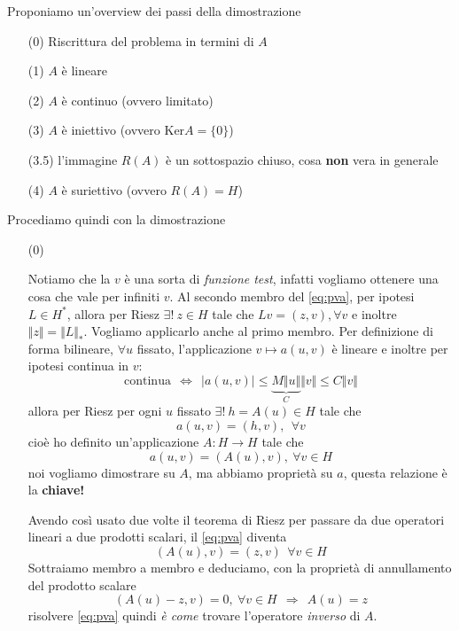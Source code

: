 \begin{dimostrazione}
    Proponiamo un'overview dei passi della dimostrazione
    \begin{enumerate}
        \item[(0)] Riscrittura del problema in termini di $A$
        \item[(1)] $A$ è lineare
        \item[(2)] $A$ è continuo (ovvero limitato)
        \item[(3)] $A$ è iniettivo (ovvero $\mathrm{Ker} A=\{0\}$)
        \item[(3.5)] l'immagine $R(A)$ è un sottospazio chiuso, cosa \textbf{non} vera in generale
        \item[(4)] $A$ è suriettivo (ovvero $R(A) =H$)
    \end{enumerate}
    Procediamo quindi con la dimostrazione
    \begin{itemize}
        \item[(0)]

              Notiamo che la $v$ è una sorta di \textit{funzione test}, infatti vogliamo ottenere una cosa che vale per infiniti $v$. Al secondo membro del \eqref{eq:pva}, per ipotesi $L\in H^{*}$, allora per Riesz $\exists !\ z\in H$ tale che $Lv=(z,v),\forall v$ e inoltre $\Vert z\Vert =\Vert L\Vert _{*}$. Vogliamo applicarlo anche al primo membro. Per definizione di forma bilineare, $\forall u$ fissato, l'applicazione $v\mapsto a(u,v)$ è lineare e inoltre per ipotesi continua in $v$:
              \begin{equation*}
                  \text{continua} \ \ \Leftrightarrow \ \ | a(u,v)| \leq \underbrace{M\Vert u\Vert }_{C}\Vert v\Vert \leq C\Vert v\Vert
              \end{equation*}
              allora per Riesz per ogni $u$ fissato $\exists !\ h=A(u) \in H$ tale che
              \begin{equation*}
                  a(u,v) =(h,v),\ \ \forall v
              \end{equation*}
              cioè ho definito un'applicazione $A:H\rightarrow H$ tale che
              \begin{equation*}
                  \boxed{a(u,v) =(A(u),v),\ \forall v\in H}
              \end{equation*}
              noi vogliamo dimostrare su $A$, ma abbiamo proprietà su $a$, questa relazione è la \textbf{chiave!}

              Avendo così usato due volte il teorema di Riesz per passare da due operatori lineari a due prodotti scalari, il \eqref{eq:pva} diventa
              \begin{equation*}
                  (A(u),v) =(z,v) \ \ \forall v\in H
              \end{equation*}
              Sottraiamo membro a membro e deduciamo, con la proprietà di annullamento del prodotto scalare
              \begin{equation*}
                  (A(u) -z,v) =0,\ \forall v\in H\ \ \Rightarrow \ \ \boxed{A(u) =z}
              \end{equation*}
              risolvere \eqref{eq:pva} quindi \textit{è come} trovare l'operatore \textit{inverso} di $A$.


\end{itemize}
\end{dimostrazione}
